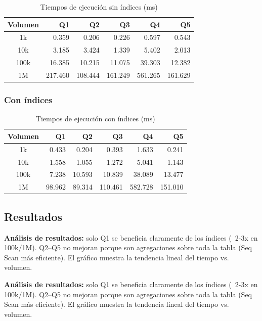 \documentclass[12pt,a4paper]{article}
\begin{document}
\begin{table}[H]
\centering
\begin{tabular}{|c|r|r|r|r|r|}
\hline
\textbf{Volumen} & \textbf{Q1} & \textbf{Q2} & \textbf{Q3} & \textbf{Q4} & \textbf{Q5} \\
\hline
1k & 0.359 & 0.206 & 0.226 & 0.597 & 0.543 \\
10k & 3.185 & 3.424 & 1.339 & 5.402 & 2.013 \\
100k & 16.385 & 10.215 & 11.075 & 39.303 & 12.382 \\
1M & 217.460 & 108.444 & 161.249 & 561.265 & 161.629 \\
\hline
\end{tabular}
\caption{Tiempos de ejecución sin índices (ms)}
\end{table}

\subsubsection{Con índices}

\begin{table}[H]
\centering
\begin{tabular}{|c|r|r|r|r|r|}
\hline
\textbf{Volumen} & \textbf{Q1} & \textbf{Q2} & \textbf{Q3} & \textbf{Q4} & \textbf{Q5} \\
\hline
1k & 0.433 & 0.204 & 0.393 & 1.633 & 0.241 \\
10k & 1.558 & 1.055 & 1.272 & 5.041 & 1.143 \\
100k & 7.238 & 10.593 & 10.839 & 38.089 & 13.477 \\
1M & 98.962 & 89.314 & 110.461 & 582.728 & 151.010 \\
\hline
\end{tabular}
\caption{Tiempos de ejecución con índices (ms)}
\end{table}

\subsection{Resultados}

\textbf{Análisis de resultados:} solo Q1 se beneficia claramente de los índices (~2-3x en 100k/1M). Q2–Q5 no mejoran porque son agregaciones sobre toda la tabla (Seq Scan más eficiente). El gráfico muestra la tendencia lineal del tiempo vs. volumen.

\textbf{Análisis de resultados:} solo Q1 se beneficia claramente de los índices (~2-3x en 100k/1M). Q2–Q5 no mejoran porque son agregaciones sobre toda la tabla (Seq Scan más eficiente). El gráfico muestra la tendencia lineal del tiempo vs. volumen.
\end{document}
